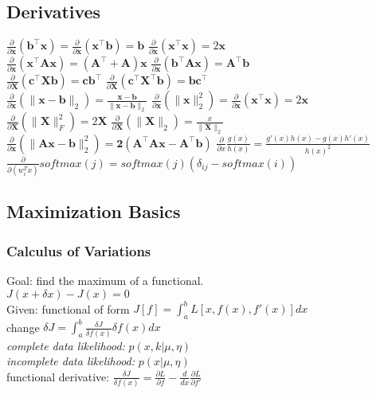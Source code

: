 \documentclass[9pt,parskip]{scrartcl}
\begin{document}
\begin{multicols*}{4}
\subsection*{Derivatives}
$\frac{\partial}{\partial \mathbf{x}}(\mathbf{b}^\top \mathbf{x}) = \frac{\partial}{\partial \mathbf{x}}(\mathbf{x}^\top \mathbf{b}) = \mathbf{b}$ \quad
$\frac{\partial}{\partial \mathbf{x}}(\mathbf{x}^\top \mathbf{x}) = 2\mathbf{x}$\\
$\frac{\partial}{\partial \mathbf{x}}(\mathbf{x}^\top \mathbf{A}\mathbf{x}) = (\mathbf{A}^\top + \mathbf{A})\mathbf{x}$ \quad
$\frac{\partial}{\partial \mathbf{x}}(\mathbf{b}^\top \mathbf{A}\mathbf{x}) = \mathbf{A}^\top \mathbf{b}$\\
$\frac{\partial}{\partial \mathbf{X}}(\mathbf{c}^\top \mathbf{X} \mathbf{b}) = \mathbf{c}\mathbf{b}^\top$ \quad
$\frac{\partial}{\partial \mathbf{X}}(\mathbf{c}^\top \mathbf{X}^\top \mathbf{b}) = \mathbf{b}\mathbf{c}^\top$\\
$\frac{\partial}{\partial \mathbf{x}}(\| \mathbf{x}-\mathbf{b} \|_2) = \frac{\mathbf{x}-\mathbf{b}}{\|\mathbf{x}-\mathbf{b}\|_2}$ \quad
$\frac{\partial}{\partial \mathbf{x}}(\|\mathbf{x}\|^2_2) = \frac{\partial}{\partial \mathbf{x}} (\mathbf{x}^\top \mathbf{x}) = 2\mathbf{x}$\\
$\frac{\partial}{\partial \mathbf{X}}(\|\mathbf{X}\|_F^2) = 2\mathbf{X}$ \quad
$\frac{\partial}{\partial \mathbf{X}}(\|\mathbf{X}\|_2) = \frac{x}{\|\mathbf{X}\|_2}$ \\ 

$\frac{\partial}{\partial \mathbf{x}}(\|\mathbf{Ax - b}\|_2^2) = \mathbf{2(A^\top Ax-A^\top b)}$
$\frac{\partial}{\partial x}\frac{g(x)}{h(x)} = \frac{g'(x)h(x) - g(x)h'(x)}{h(x)^2}$\\
$\frac{\partial}{\partial(w_i^Tx)}softmax(j)= softmax(j)(\delta_{ij} - softmax(i))$

\subsection*{Maximization Basics}
\subsubsection*{Calculus of Variations}
Goal: find the maximum of a functional. \\
$J(x + \delta x) - J(x) = 0$ \\
Given: functional of form 
$J[f]=\int _{a}^{b} L[x,f(x),f'(x)] dx $ \\
change $\delta J = \int_a^b  \frac{\delta J}{\delta f(x)} \delta f(x) dx $ \\
\textit{complete data likelihood:} $p(x,k|\mu, \eta)$\\
\textit{incomplete data likelihood:} $p(x|\mu, \eta)$\\
functional derivative: $\frac{\delta J}{\delta f(x)} = \frac{\partial L}{\partial f} -\frac{d}{dx} \frac{\partial L}{\partial f'} $

\end{multicols*}
\end{document}
